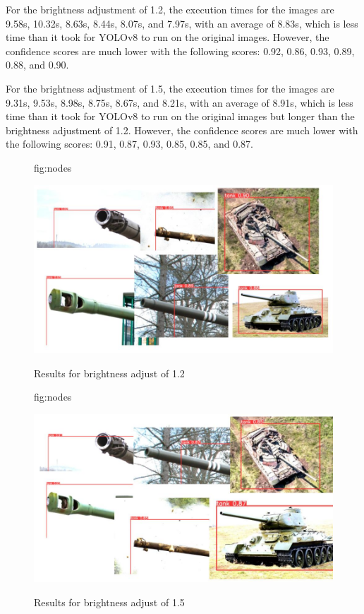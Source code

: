 \documentclass[pmlr,twocolumn,10pt]{jmlr} %
\begin{document}
For the brightness adjustment of 1.2, the execution times for the images are 9.58s, 10.32s, 8.63s, 8.44s, 8.07s, and 7.97s, with an average of 8.83s, which is less time than it took for YOLOv8 to run on the original images. However, the confidence scores are much lower with the following scores: 0.92, 0.86, 0.93, 0.89, 0.88, and 0.90.

For the brightness adjustment of 1.5, the execution times for the images are 9.31s, 9.53s, 8.98s, 8.75s, 8.67s, and 8.21s, with an average of 8.91s, which is less time than it took for YOLOv8 to run on the original images but longer than the brightness adjustment of 1.2. However, the confidence scores are much lower with the following scores: 0.91, 0.87, 0.93, 0.85, 0.85, and 0.87.

\begin{figure}[htbp]
\floatconts
  {fig:nodes}
  {\caption{Results for brightness adjust of 1.2}}
  {\includegraphics[width=1\linewidth]{images/Yolo8Bright12.jpg}}
\end{figure}

\begin{figure}[htbp]
\floatconts
  {fig:nodes}
  {\caption{Results for brightness adjust of 1.5}}
  {\includegraphics[width=1\linewidth]{images/Yolo8Bright15.jpg}}
\end{figure}
\end{document}
